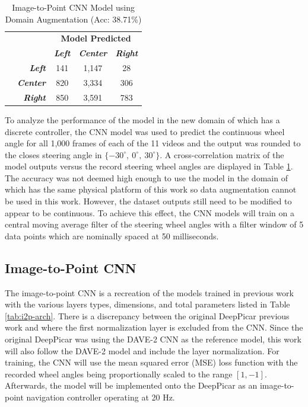 \documentclass[conference]{IEEEtran}
\begin{document}
\begin{table}[btp]
        \centering
            \caption{Image-to-Point CNN Model using Domain Augmentation (Acc: 38.71\%)}
            \begin{tabular}{|c|r|c|c|c|}
            \multicolumn{2}{c}{} & \multicolumn{3}{c}{\bfseries Model Predicted}\\\cline{3-5}
            \multicolumn{1}{c}{} & & \textbf{\textit{Left}} & \textbf{\textit{Center}} & \textbf{\textit{Right}}\\\hline
             \parbox[t]{2mm}{} & \textbf{\textit{Left}} & 141 & 1,147 & 28 \\
            & \textbf{\textit{Center}} & 820 & 3,334 & 306 \\
            & \textbf{\textit{Right}} & 850 & 3,591 & 783 \\\hline
            \end{tabular}
        \label{tab:i2p-da-acc}
    \end{table}

To analyze the performance of the model in the new domain of \cite{bechtel2018} which has a discrete controller, the CNN model was used to predict the continuous wheel angle for all 1,000 frames of each of the 11 videos and the output was rounded to the closes steering angle in $\lbrace -30^\circ,\ 0^\circ,\ 30^\circ \rbrace$. A cross-correlation matrix of the model outputs versus the record steering wheel angles are displayed in Table \ref{tab:i2p-da-acc}. The accuracy was not deemed high enough to use the model in the domain of \cite{bechtel2018} which has the same physical platform of this work so data augmentation cannot be used in this work. However, the \cite{bechtel2018} dataset outputs still need to be  modified to appear to be continuous. To achieve this effect, the CNN models will train on a central moving average filter of the steering wheel angles with a filter window of 5 data points which are nominally spaced at 50 milliseconds.

\subsection{Image-to-Point CNN}

The image-to-point CNN is a recreation of the models trained in previous work \cite{bechtel2018,bojarski2016end} with the various layers types, dimensions, and total parameters listed in Table \ref{tab:i2p-arch}. There is a discrepancy between the original DeepPicar previous work \cite{bechtel2018} and \cite{bojarski2016end} where the first normalization layer is excluded from the CNN. Since the original DeepPicar was using the DAVE-2 CNN as the reference model, this work will also follow the DAVE-2 model and include the layer normalization. For training, the CNN will use the mean squared error (MSE) loss function with the recorded wheel angles being proportionally scaled to the range $[1, -1]$. Afterwards, the model will be implemented onto the DeepPicar as an image-to-point navigation controller operating at 20 Hz.
\end{document}
